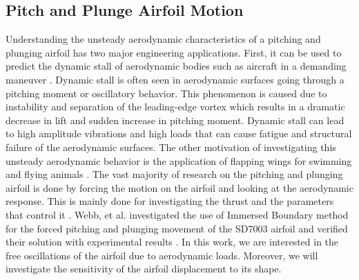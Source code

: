 \subsection{Pitch and Plunge Airfoil Motion}
Understanding the unsteady aerodynamic characteristics of a pitching and plunging airfoil has two major engineering applications. First, it can be used to predict the dynamic stall of aerodynamic bodies such as aircraft in a demanding maneuver \cite{tuncer1998computational}. Dynamic stall is often seen in aerodynamic surfaces going through a pitching moment or oscillatory behavior. This phenomenon is caused due to instability and separation of the leading-edge vortex which results in a dramatic decrease in lift and sudden increase in pitching moment. Dynamic stall can lead to high amplitude vibrations and high loads that can cause fatigue and structural failure of the aerodynamic surfaces. The other motivation of investigating this unsteady aerodynamic behavior is the application of flapping wings for swimming and flying animals \cite{shyy2008computational}. The vast majority of research on the pitching and plunging airfoil is done by forcing the motion on the airfoil and looking at the aerodynamic response. This is mainly done for investigating the thrust and the parameters that control it \cite{tuncer2000computational, lian2008comparative}. Webb, et al. investigated the use of Immersed Boundary method for the forced pitching and plunging movement of the SD7003 airfoil and verified their solution with experimental results \cite{webb2008effects}. In this work, we are interested in the free oscillations of the airfoil due to aerodynamic loads. Moreover, we will investigate the sensitivity of the airfoil displacement to its shape.

